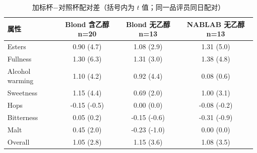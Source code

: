 \begin{table}[htbp]
\centering
\caption{加标杯$-$对照杯配对差（括号内为 $t$ 值；同一品评员同日配对）}\label{tab:q2_spike}
\begin{tabular}{lccc}
\toprule
属性 & Blond 含乙醇 n=20 & Blond 无乙醇 n=13 & NABLAB 无乙醇 n=13 \\
\midrule
Esters & 0.90 (4.7) & 1.08 (2.9) & 1.31 (5.0) \\
Fullness & 1.30 (6.3) & 1.31 (3.0) & 1.38 (4.8) \\
Alcohol warming & 1.10 (4.2) & 0.92 (4.4) & 0.08 (0.6) \\
Sweetness & 1.15 (4.4) & 0.69 (2.0) & 1.00 (3.1) \\
Hops & -0.15 (-0.5) & 0.00 (0.0) & -0.08 (-0.2) \\
Bitterness & 0.05 (0.2) & -0.15 (-0.6) & -0.31 (-0.9) \\
Malt & 0.45 (2.0) & -0.23 (-1.0) & 0.00 (0.0) \\
Overall & 1.05 (2.8) & 1.15 (3.6) & 1.08 (3.5) \\
\bottomrule
\end{tabular}
\end{table}
